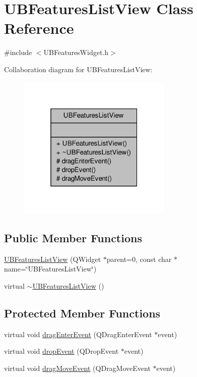 \hypertarget{class_u_b_features_list_view}{\section{U\-B\-Features\-List\-View Class Reference}
\label{d5/d12/class_u_b_features_list_view}
}


{\ttfamily \#include $<$U\-B\-Features\-Widget.\-h$>$}



Collaboration diagram for U\-B\-Features\-List\-View\-:
\nopagebreak
\begin{figure}[H]
\begin{center}
\leavevmode
\includegraphics[width=208pt]{d2/dfe/class_u_b_features_list_view__coll__graph}
\end{center}
\end{figure}
\subsection*{Public Member Functions}
\begin{DoxyCompactItemize}
\item 
\hyperlink{class_u_b_features_list_view_a6e50f0dcb61fb69c2c01720dfeb22795}{U\-B\-Features\-List\-View} (Q\-Widget $\ast$parent=0, const char $\ast$name=\char`\"{}U\-B\-Features\-List\-View\char`\"{})
\item 
virtual \hyperlink{class_u_b_features_list_view_a67bd4cf842ac8906fe0c8517f580fd5d}{$\sim$\-U\-B\-Features\-List\-View} ()
\end{DoxyCompactItemize}
\subsection*{Protected Member Functions}
\begin{DoxyCompactItemize}
\item 
virtual void \hyperlink{class_u_b_features_list_view_afda3ef8c8265dfcaf19f3a371a90a399}{drag\-Enter\-Event} (Q\-Drag\-Enter\-Event $\ast$event)
\item 
virtual void \hyperlink{class_u_b_features_list_view_afff1432550328be8db51b27da8154765}{drop\-Event} (Q\-Drop\-Event $\ast$event)
\item 
virtual void \hyperlink{class_u_b_features_list_view_a10c5a5669a84a571657ac124cb3442a0}{drag\-Move\-Event} (Q\-Drag\-Move\-Event $\ast$event)
\end{DoxyCompactItemize}


